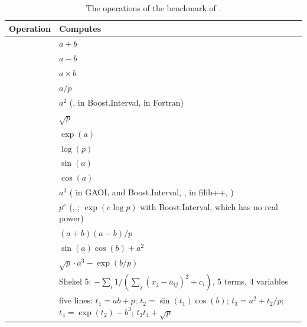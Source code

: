 \documentclass[12pt,a4paper,twoside,openright]{book}
\begin{document}
\begin{table}[htbp]
\centering\footnotesize
\begin{tabular}{|l|L{10.5cm}|}
\hline
\textbf{Operation} & \textbf{Computes} \\
\hline
{} & $a + b$ \\
 & $a - b$ \\
 & $a \times b$ \\
 & $a / p$ \\
 & $a^2$ (,  in Boost.Interval,
 in Fortran) \\
 & $\sqrt{p}$ \\
 & $\exp(a)$ \\
 & $\log(p)$ \\
 & $\sin(a)$ \\
 & $\cos(a)$ \\
 & $a^3$ ( in GAOL and Boost.Interval,
,  in filib++, ) \\
 & $p^e$ (, ; $\exp(e \log p)$
with Boost.Interval, which has no real power) \\
 & $(a + b)(a - b) / p$ \\
 & $\sin(a) \cos(b) + a^2$ \\
 & $\sqrt{p} \cdot a^3 - \exp(b / p)$ \\
 & Shekel 5: $-\sum_i 1 / (\sum_j (x_j - a_{ij})^2 + c_i)$,
5 terms, 4 variables \\
 & five lines: $t_1 = ab + p$; $t_2 = \sin(t_1) \cos(b)$;
$t_3 = a^2 + t_2/p$; $t_4 = \exp(t_2) - b^3$; $t_3 t_4 + \sqrt{p}$ \\
\hline
\end{tabular}
\caption{The operations of the benchmark of .}
\label{tab:computing-bench-ops}
\end{table}
\end{document}
